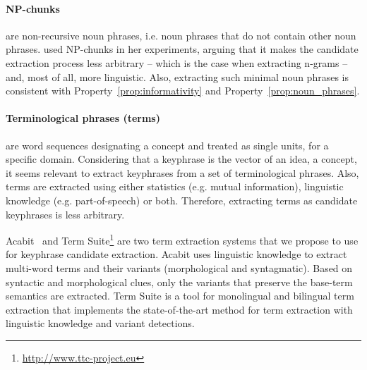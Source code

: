   \paragraph{NP-chunks} are non-recursive noun phrases, i.e. noun phrases that
  do not contain other noun phrases.  used
  NP-chunks in her experiments, arguing that it makes the candidate extraction
  process less arbitrary -- which is the case when extracting n-grams -- and,
  most of all, more linguistic. Also, extracting such minimal noun phrases is
  consistent with Property~\ref{prop:informativity} and
  Property~\ref{prop:noun_phrases}.

  \paragraph{Terminological phrases (terms)} are word sequences designating a
  concept and treated as single units, for a specific domain. Considering that a
  keyphrase is the vector of an idea, a concept, it seems relevant to extract
  keyphrases from  a set of terminological phrases. Also, terms are extracted
  using either statistics (e.g. mutual information), linguistic  knowledge
  (e.g. part-of-speech) or both. Therefore, extracting terms as candidate
  keyphrases is less arbitrary.

  Acabit~\cite{daille2003acabit} and Term
  Suite\footnote{\url{http://www.ttc-project.eu}} are two term extraction
  systems that we propose to use for keyphrase candidate extraction. Acabit uses
  linguistic knowledge to extract multi-word terms and their variants
  (morphological and syntagmatic). Based on syntactic and morphological clues,
  only the variants that preserve the base-term semantics are extracted. Term
  Suite is a tool for monolingual and bilingual term extraction that implements
  the state-of-the-art method for term extraction with linguistic knowledge and
  variant detections.


